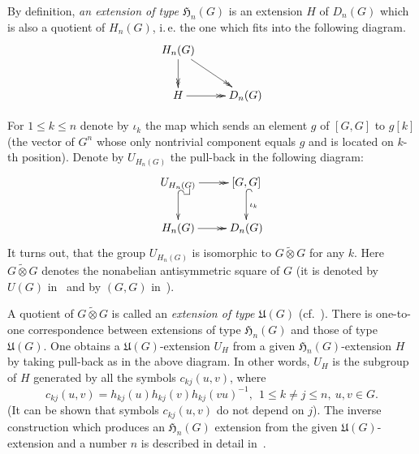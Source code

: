 \documentclass[oneside, 10pt]{amsart}
\makeatletter
\theoremstyle{plain}
\numberwithin{equation}{section}
\numberwithin{lemma}{section}
\theoremstyle{remark}
\theoremstyle{definition}
\newcommand{\pullbackcorner}[1][dr]{\save*!/#1-1.2pc/#1:(-1,1)@^{|-}\restore}
\makeatother
\begin{document}
By definition, {\it an extension of type $\mathfrak{H}_n(G)$} is an extension $H$ of $D_n(G)$ which is also a quotient of $H_n(G)$, i.\,e. 
 the one which fits into the following diagram.
\[ \xymatrix{ H_n(G) \ar@{->>}[rd] \ar@{->>}[d] & \\ H \ar@{->>}[r] & D_n(G)} \]

For $1\leq k\leq n$ denote by $\iota_k$ the map which sends an element $g$ of $[G, G]$ to $g[k]$ (the vector of $G^n$
 whose only nontrivial component equals $g$ and is located on $k$-th position).
Denote by $U_{H_n(G)}$ the pull-back in the following diagram:
\[ \xymatrix{ U_{H_n(G)} \pullbackcorner \ar@{^{(}->}[d] \ar@{->>}[r] & [G, G] \ar@{^{(}->}[d]^{\iota_k} \\ H_n(G) \ar@{->>}[r] & D_n(G)}\]
It turns out, that the group $U_{H_n(G)}$ is isomorphic to $G \mathbin{\widetilde{\otimes}} G$ for any $k$.
Here $G \mathbin{\widetilde{\otimes}} G$  denotes the nonabelian antisymmetric square of $G$ 
  (it is denoted by $U(G)$ in~\cite{Reh78} and by $(G, G)$ in~\cite{De76}).

A quotient of $G \mathbin{\widetilde{\otimes}} G$ is called an {\it extension of type $\mathfrak{U}(G)$} (cf.~\cite[\S~1]{Reh78}).
There is one-to-one correspondence between extensions of type $\mathfrak{H}_n(G)$ and those of type $\mathfrak{U}(G)$.
One obtains a $\mathfrak{U}(G)$-extension $U_H$ from a given $\mathfrak{H}_n(G)$-extension $H$ by taking pull-back as in the above diagram.
In other words, $U_H$ is the subgroup of $H$ generated by all the symbols $c_{kj}(u, v)$, where
\[c_{kj}(u,v)=h_{kj}(u)h_{kj}(v)h_{kj}(vu)^{-1}, \ \ 1\leq k \neq j \leq n,\ u,v \in G.\]
(It can be shown that symbols $c_{kj}(u, v)$ do not depend on $j$).
The inverse construction which produces an $\mathfrak{H}_n(G)$ extension from the given $\mathfrak{U}(G)$-extension and a number $n$ is described in detail in~\cite[\S~3]{Reh78}.
\end{document}
